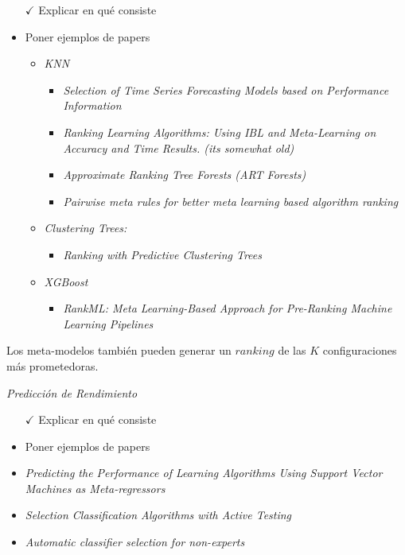 \begin{itemize}
	\item[$\checkmark$] Explicar en qué consiste
	\item Poner ejemplos de papers
	\begin{itemize}
		\item \textit{KNN} 	
		\begin{itemize}
			\item \textit{Selection of Time Series Forecasting Models based on Performance Information}
			\item \textit{Ranking Learning Algorithms: Using IBL and Meta-Learning on Accuracy and Time Results. (its somewhat old)}
			\item \textit{Approximate Ranking Tree Forests (ART Forests)}
			\item \textit{Pairwise meta rules for better meta learning based algorithm ranking}	
		\end{itemize}
		\item \textit{Clustering Trees:}
		\begin{itemize}
			\item \textit{Ranking with Predictive Clustering Trees}
		\end{itemize}
		\item \textit{XGBoost}
		\begin{itemize}
			\item \textit{RankML: Meta Learning-Based Approach for Pre-Ranking Machine Learning Pipelines}
		\end{itemize}
	\end{itemize}
\end{itemize}

Los meta-modelos también pueden generar un $ranking$ de las $K$ configuraciones más prometedoras. 

\textit{Predicción de Rendimiento}

\begin{itemize}
	\item[$\checkmark$] Explicar en qué consiste
	\item Poner ejemplos de papers
	\item \textit{Predicting the Performance of Learning Algorithms Using Support Vector Machines as Meta-regressors}
	\item \textit{Selection Classification Algorithms with Active Testing}
	\item \textit{Automatic classifier selection for non-experts}
\end{itemize}

